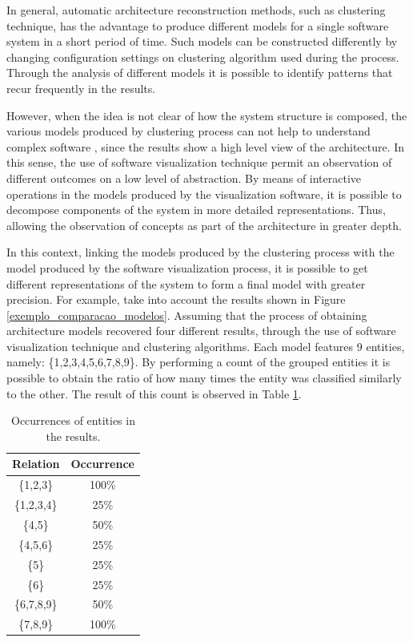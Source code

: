 \documentclass{sig-alternate-05-2015}
\begin{document}
In general, automatic architecture reconstruction methods, such as clustering technique, has the advantage to produce different models for a single software system in a short period of time. Such models can be constructed differently by changing configuration settings on clustering algorithm used during the process. Through the analysis of different models it is possible to identify patterns that recur frequently in the results.

However, when the idea is not clear of how the system structure is composed, the various models produced by clustering process can not help to understand complex software \cite{craft}, since the results show a high level view of the architecture. In this sense, the use of software visualization technique permit an observation of different outcomes on a low level of abstraction. By means of interactive operations in the models produced by the visualization software, it is possible to decompose components of the system in more detailed representations. Thus, allowing the observation of concepts as part of the architecture in greater depth.

In this context, linking the models produced by the clustering process with the model produced by the software visualization process, it is possible to get different representations of the system to form a final model with greater precision. For example, take into account the results shown in Figure \ref{exemplo_comparacao_modelos}. Assuming that the process of obtaining architecture models recovered four different results, through the use of software visualization technique and clustering algorithms. Each model features 9 entities, namely: \{1,2,3,4,5,6,7,8,9\}. By performing a count of the grouped entities it is  possible to obtain the ratio of how many times the entity was classified similarly to the other. The result of this count is observed in Table \ref{ocorrencias_1}.

\begin{table}[]
	\centering
	\caption{Occurrences of entities in the results.}
	\label{ocorrencias_1}
	\begin{tabular}{|cc|}
		\hline
		\multicolumn{1}{|l}{Relation} & \multicolumn{1}{l|}{Occurrence} \\ \hline
		\{1,2,3\}                   & 100\%                           \\
		\{1,2,3,4\}                 & 25\%                            \\
		\{4,5\}                     & 50\%                            \\
		\{4,5,6\}                   & 25\%                            \\
		\{5\}                       & 25\%                            \\
		\{6\}                       & 25\%                            \\
		\{6,7,8,9\}                 & 50\%                            \\
		\{7,8,9\}                   & 100\%                           \\ \hline
	\end{tabular}
\end{table}
\end{document}
